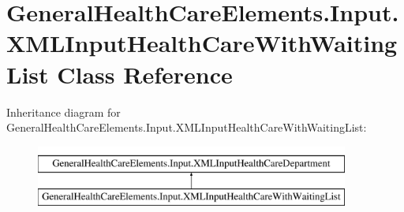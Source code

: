 \hypertarget{class_general_health_care_elements_1_1_input_1_1_x_m_l_input_health_care_with_waiting_list}{}\section{General\+Health\+Care\+Elements.\+Input.\+X\+M\+L\+Input\+Health\+Care\+With\+Waiting\+List Class Reference}
\label{class_general_health_care_elements_1_1_input_1_1_x_m_l_input_health_care_with_waiting_list}
Inheritance diagram for General\+Health\+Care\+Elements.\+Input.\+X\+M\+L\+Input\+Health\+Care\+With\+Waiting\+List\+:\begin{figure}[H]
\begin{center}
\leavevmode
\includegraphics[height=2.000000cm]{class_general_health_care_elements_1_1_input_1_1_x_m_l_input_health_care_with_waiting_list}
\end{center}
\end{figure}
